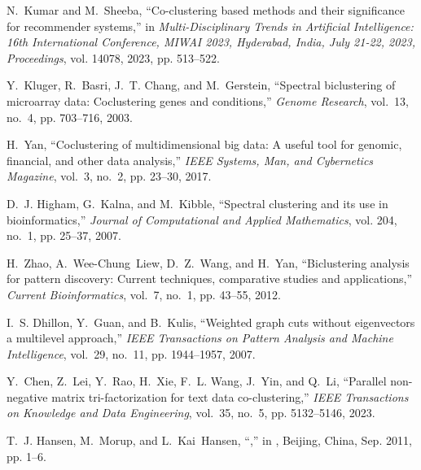 \documentclass[letterpaper, 10 pt, conference]{ieeeconf}  %
\begin{document}
\begin{thebibliography}{10}
        N.~Kumar and M.~Sheeba, ``Co-clustering based methods and their significance
        for recommender systems,'' in \emph{Multi-Disciplinary Trends in Artificial
                Intelligence: 16th International Conference, MIWAI 2023, Hyderabad, India,
                July 21-22, 2023, Proceedings}, vol. 14078, 2023, pp. 513--522.

        Y.~Kluger, R.~Basri, J.~T. Chang, and M.~Gerstein, ``Spectral biclustering of
        microarray data: Coclustering genes and conditions,'' \emph{Genome Research},
        vol.~13, no.~4, pp. 703--716, 2003.

        H.~Yan, ``Coclustering of multidimensional big data: A useful tool for genomic,
        financial, and other data analysis,'' \emph{IEEE Systems, Man, and
                Cybernetics Magazine}, vol.~3, no.~2, pp. 23--30, 2017.

        D.~J. Higham, G.~Kalna, and M.~Kibble, ``Spectral clustering and its use in
        bioinformatics,'' \emph{Journal of Computational and Applied Mathematics},
        vol. 204, no.~1, pp. 25--37, 2007.

        H.~Zhao, A.~Wee-Chung~Liew, D.~Z.~Wang, and H.~Yan, ``Biclustering analysis for
        pattern discovery: Current techniques, comparative studies and
        applications,'' \emph{Current Bioinformatics}, vol.~7, no.~1, pp. 43--55,
        2012.

        I.~S. Dhillon, Y.~Guan, and B.~Kulis, ``Weighted graph cuts without
        eigenvectors a multilevel approach,'' \emph{IEEE Transactions on Pattern
                Analysis and Machine Intelligence}, vol.~29, no.~11, pp. 1944--1957, 2007.

        Y.~Chen, Z.~Lei, Y.~Rao, H.~Xie, F.~L. Wang, J.~Yin, and Q.~Li, ``Parallel
        non-negative matrix tri-factorization for text data co-clustering,''
        \emph{IEEE Transactions on Knowledge and Data Engineering}, vol.~35, no.~5,
        pp. 5132--5146, 2023.

        T.~J. Hansen, M.~Morup, and L.~Kai~Hansen,
        ``,'' in \emph{}, Beijing, China, Sep. 2011, pp. 1--6.


\end{thebibliography}
\end{document}

